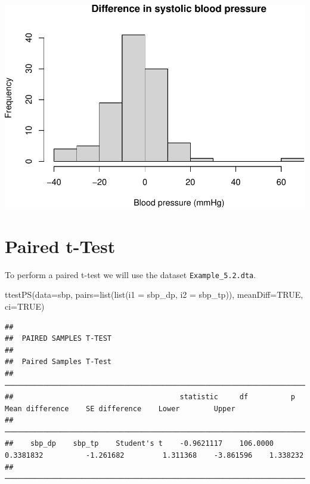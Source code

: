 \documentclass[
]{memoir}
\newenvironment{Shaded}{\begin{snugshade}}{\end{snugshade}}
\newcommand{\AttributeTok}[1]{\textcolor[rgb]{0.77,0.63,0.00}{#1}}
\newcommand{\ConstantTok}[1]{\textcolor[rgb]{0.00,0.00,0.00}{#1}}
\newcommand{\FunctionTok}[1]{\textcolor[rgb]{0.00,0.00,0.00}{#1}}
\newcommand{\NormalTok}[1]{#1}
\newcommand{\StringTok}[1]{\textcolor[rgb]{0.31,0.60,0.02}{#1}}
\begin{document}
\includegraphics{phcm9795-R-notes_files/figure-latex/unnamed-chunk-73-1.pdf}

\hypertarget{paired-t-test}{%
\section{Paired t-Test}\label{paired-t-test}}

To perform a paired t-test we will use the dataset \texttt{Example\_5.2.dta}.

\begin{Shaded}
\begin{Highlighting}[]
\FunctionTok{ttestPS}\NormalTok{(}\AttributeTok{data=}\NormalTok{sbp, }\AttributeTok{pairs=}\FunctionTok{list}\NormalTok{(}\FunctionTok{list}\NormalTok{(}\AttributeTok{i1 =} \StringTok{\textquotesingle{}sbp\_dp\textquotesingle{}}\NormalTok{, }\AttributeTok{i2 =} \StringTok{\textquotesingle{}sbp\_tp\textquotesingle{}}\NormalTok{)), }\AttributeTok{meanDiff=}\ConstantTok{TRUE}\NormalTok{, }\AttributeTok{ci=}\ConstantTok{TRUE}\NormalTok{)}
\end{Highlighting}
\end{Shaded}

\begin{verbatim}
## 
##  PAIRED SAMPLES T-TEST
## 
##  Paired Samples T-Test                                                                                                                   
##  ─────────────────────────────────────────────────────────────────────────────────────────────────────────────────────────────────────── 
##                                       statistic     df          p            Mean difference    SE difference    Lower        Upper      
##  ─────────────────────────────────────────────────────────────────────────────────────────────────────────────────────────────────────── 
##    sbp_dp    sbp_tp    Student's t    -0.9621117    106.0000    0.3381832          -1.261682         1.311368    -3.861596    1.338232   
##  ───────────────────────────────────────────────────────────────────────────────────────────────────────────────────────────────────────
\end{verbatim}
\end{document}

